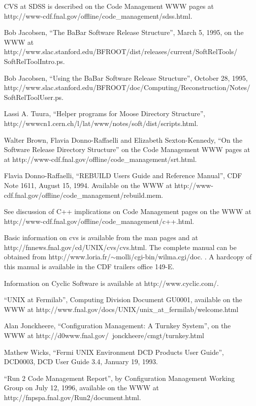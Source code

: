 \documentclass[12pt]{article}
\begin{document}


\clearpage
{}
\begin{thebibliography}{99}

 CVS at SDSS is described on the Code Management WWW pages
at http://www-cdf.fnal.gov/offline/code\_management/sdss.html.

 Bob Jacobsen, ``The BaBar Software Release Structure'',
March 5, 1995, on the WWW at
http://www.slac.stanford.edu/BFROOT/dist/releases/current/SoftRelTools/ 
SoftRelToolIntro.ps.

 Bob Jacobsen, ``Using the BaBar Software Release 
Structure'', October 28, 1995, 
http://www.slac.stanford.edu/BFROOT/doc/Computing/Reconstruction/Notes/
SoftRelToolUser.ps.

 Lassi A. Tuura, ``Helper programs for Moose Directory
Structure'', http://wwwcn1.cern.ch/l/lat/www/notes/soft/dist/scripts.html.

 Walter Brown, Flavia Donno-Raffaelli and Elizabeth
Sexton-Kennedy, ``On the Software Release Directory Structure'' on the Code
Management WWW pages at 
at http://www-cdf.fnal.gov/offline/code\_management/srt.html.

 Flavia Donno-Raffaelli, ``REBUILD Users Guide and
Reference Manual'', CDF Note 1611, August 15, 1994.  Available on the WWW at
http://www-cdf.fnal.gov/offline/code\_management/rebuild.mem.

 See discussion of C++ implications on Code Management
pages on the WWW at 
http://www-cdf.fnal.gov/offline/code\_management/c++.html.

 Basic information on cvs is available from the man pages 
and at http://fnnews.fnal.gov/cd/UNIX/cvs/cvs.html. The complete manual can
be obtained from http://www.loria.fr/$\sim$molli/cgi-bin/wilma.cgi/doc.
.  A hardcopy of this manual is available in the CDF 
trailers office 149-E.

 Information on Cyclic Software is available at 
http://www.cyclic.com/.

 ``UNIX at Fermilab'', Computing Division Document GU0001, 
available on the WWW at
http://www.fnal.gov/docs/UNIX/unix\_at\_fermilab/welcome.html

 Alan Jonckheere, ``Configuration Management: A Turnkey 
System'', on the WWW at 
http://d0www.fnal.gov/\texttt{~}jonckheere/cmgt/turnkey.html

 Mathew Wicks, ``Fermi UNIX Environment DCD Products User
Guide'', DCD0003, DCD User Guide 3.4, January 19, 1993.

 ``Run 2 Code Management Report'', by Configuration 
Management Working Group on July 12, 1996, available on the WWW at 
http://fnpspa.fnal.gov/Run2/document.html.
\end{thebibliography}
\end{document}
